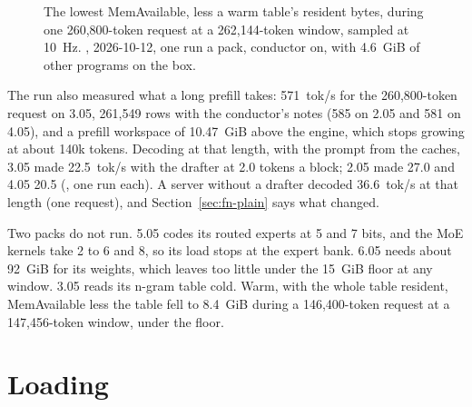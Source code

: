\begin{figure}[htbp]
\centering
{}
\caption[The packs at a 262,144-token window]{The lowest MemAvailable, less a warm table's resident bytes, during one 260,800-token request at a 262,144-token window, sampled at 10~Hz. \measured, 2026-10-12, one run a pack, conductor on, with 4.6~GiB of other programs on the box.}\label{fig:fn-fit}
\end{figure}

The run also measured what a long prefill takes: 571~tok/s for the 260,800-token request on 3.05, 261,549 rows with the conductor's notes (585 on 2.05 and 581 on 4.05), and a prefill workspace of 10.47~GiB above the engine, which stops growing at about 140k tokens. Decoding at that length, with the prompt from the caches, 3.05 made 22.5~tok/s with the drafter at 2.0 tokens a block; 2.05 made 27.0 and 4.05 20.5 (\measured, one run each). A server without a drafter decoded 36.6~tok/s at that length (one request), and Section~\ref{sec:fn-plain} says what changed.

Two packs do not run. 5.05 codes its routed experts at 5 and 7 bits, and the MoE kernels take 2 to 6 and 8, so its load stops at the expert bank. 6.05 needs about 92~GiB for its weights, which leaves too little under the 15~GiB floor at any window. 3.05 reads its n-gram table cold. Warm, with the whole table resident, MemAvailable less the table fell to 8.4~GiB during a 146,400-token request at a 147,456-token window, under the floor.

\section{Loading}

